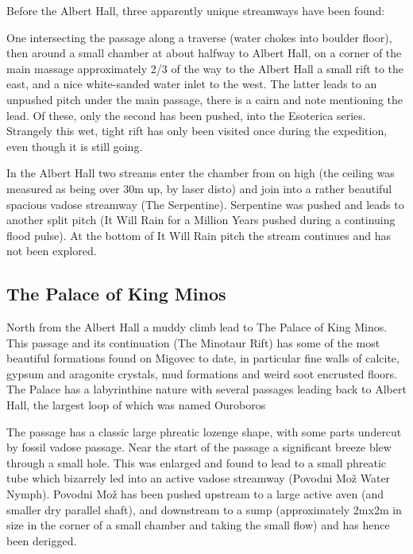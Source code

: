 Before the Albert Hall, three apparently unique streamways have been
found:

One intersecting the passage along a traverse (water chokes into boulder
floor), then around a small chamber at about halfway to Albert Hall, on
a corner of the main massage approximately 2/3 of the way to the Albert
Hall a small rift to the east, and a nice white-sanded water inlet to
the west. The latter leads to an unpushed pitch under the main passage,
there is a cairn and note mentioning the lead. Of these, only the second
has been pushed, into the Esoterica series. Strangely this wet, tight
rift has only been visited once during the expedition, even though it is
still going.

In the Albert Hall two streams enter the chamber from on high (the
ceiling was measured as being over 30m up, by laser disto) and join into
a rather beautiful spacious vadose streamway (The Serpentine).
Serpentine was pushed and leads to another split pitch (It Will Rain for
a Million Years \textemdash{} pushed during a continuing flood pulse).
At the bottom of It Will Rain pitch the stream continues and has not
been explored.

\subsection{The Palace of King Minos}\label{the-palace-of-king-minos}

North from the Albert Hall a muddy climb lead to The Palace of King
Minos. This passage and its continuation (The Minotaur Rift) has some of
the most beautiful formations found on Migovec to date, in particular
fine walls of calcite, gypsum and aragonite crystals, mud formations and
weird soot encrusted floors. The Palace has a labyrinthine nature with
several passages leading back to Albert Hall, the largest loop of which
was named Ouroboros

The passage has a classic large phreatic lozenge shape, with some parts
undercut by fossil vadose passage. Near the start of the passage a
significant breeze blew through a small hole. This was enlarged and
found to lead to a small phreatic tube which bizarrely led into an
active vadose streamway (Povodni Mo\v{z} \textemdash{} Water Nymph).
Povodni Mo\v{z} has been pushed upstream to a large active aven (and
smaller dry parallel shaft), and downstream to a sump (approximately
2mx2m in size in the corner of a small chamber and taking the small
flow) and has hence been derigged.

